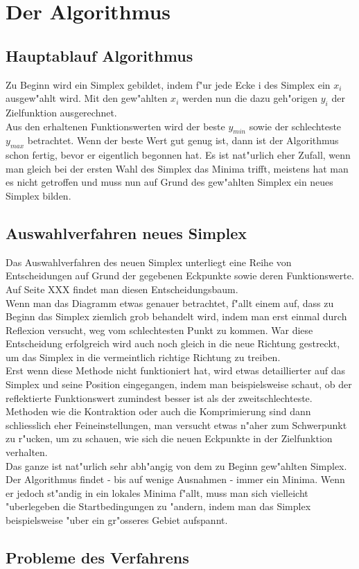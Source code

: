 \section{Der Algorithmus}

\subsection{Hauptablauf Algorithmus}
Zu Beginn wird ein Simplex gebildet, indem f"ur jede Ecke i des Simplex ein $x_i$ ausgew"ahlt wird. 
Mit den gew"ahlten $x_i$ werden nun die dazu geh"origen $y_i$ der Zielfunktion ausgerechnet. \\
Aus den erhaltenen Funktionswerten wird der beste $y_{min}$ sowie der schlechteste $y_{max}$ betrachtet. Wenn der beste Wert gut genug ist, dann ist der Algorithmus schon fertig, bevor er eigentlich begonnen hat. Es ist nat"urlich eher Zufall, wenn man gleich bei der ersten Wahl des Simplex das Minima trifft, meistens hat man es nicht getroffen und muss nun auf Grund des gew"ahlten Simplex ein neues Simplex bilden. 



\subsection{Auswahlverfahren neues Simplex}
Das Auswahlverfahren des neuen Simplex unterliegt eine Reihe von Entscheidungen auf Grund der gegebenen Eckpunkte sowie deren Funktionswerte. Auf Seite XXX findet man diesen Entscheidungsbaum.\\
Wenn man das Diagramm etwas genauer betrachtet, f"allt einem auf, dass zu Beginn das Simplex ziemlich grob behandelt wird, indem man erst einmal durch Reflexion versucht, weg vom schlechtesten Punkt zu kommen. War diese Entscheidung erfolgreich wird auch noch gleich in die neue Richtung gestreckt, um das Simplex in die vermeintlich richtige Richtung zu treiben. \\
Erst wenn diese Methode nicht funktioniert hat, wird etwas detaillierter auf das Simplex und seine Position eingegangen, indem man beispielsweise schaut, ob der reflektierte Funktionswert zumindest besser ist als der zweitschlechteste. \\
Methoden wie die Kontraktion oder auch die Komprimierung sind dann schliesslich eher Feineinstellungen, man versucht etwas n"aher zum Schwerpunkt zu r"ucken, um zu schauen, wie sich die neuen Eckpunkte in der Zielfunktion verhalten.\\
Das ganze ist nat"urlich sehr abh"angig von dem zu Beginn gew"ahlten Simplex. Der Algorithmus findet - bis auf wenige Ausnahmen - immer ein Minima. Wenn er jedoch st"andig in ein lokales Minima f"allt, muss man sich vielleicht "uberlegeben die Startbedingungen zu "andern, indem man das Simplex beispielsweise "uber ein gr"osseres Gebiet aufspannt.\\


\subsection{Probleme des Verfahrens}
